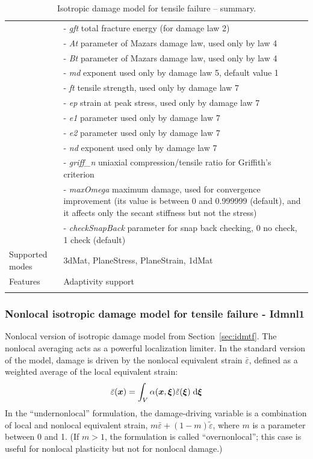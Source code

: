 \documentclass[a4paper]{article}
\newcommand{\mbf}[1]{\mbox{\boldmath$#1$}}
\newcommand{\param}[1]{{\it #1}}
\begin{document}
\begin{longtable}{|l|p{9cm}|}
&- \param{gft} total fracture energy (for damage law 2)\\
&- \param{At} parameter of Mazars damage law, used only by law 4\\
&- \param{Bt} parameter of Mazars damage law, used only by law 4\\
&- \param{md} exponent used only by damage law 5, default value 1\\
&- \param{ft} tensile strength, used only by damage law 7\\
&- \param{ep} strain at peak stress, used only by damage law 7\\
&- \param{e1} parameter used only by damage law 7\\
&- \param{e2} parameter used only by damage law 7\\
&- \param{nd} exponent used only by damage law 7\\
&- \param{griff\_n} uniaxial compression/tensile ratio for Griffith's criterion\\
&- \param{maxOmega} maximum damage, used for convergence improvement
(its value is between 0 and 0.999999 (default), and it affects only the secant stiffness
but not the stress)\\
&- \param{checkSnapBack} parameter for snap back checking, 0 no check, 1 check (default)\\
Supported modes& 3dMat, PlaneStress, PlaneStrain, 1dMat\\
Features & Adaptivity support\\
\hline
\caption{Isotropic damage model for tensile failure -- summary.}
\label{id_table}
\end{longtable}

\subsubsection{Nonlocal isotropic damage model for tensile failure - Idmnl1}
\label{sec:nidm}
Nonlocal version of isotropic damage model from Section~\ref{sec:idmtf}.
The nonlocal averaging acts as a powerful localization
limiter. 
In the standard version of the model, 
damage is driven by the nonlocal equivalent strain $\bar{\varepsilon}$, 
defined as a weighted average of the local equivalent strain:
$$
\bar{\varepsilon}(\mbf{x}) = \int_V\alpha(\mbf{x},\mbf{\xi})\tilde\varepsilon(\mbf{\xi})\;{\rm d}\mbf{\xi}
$$
In the ``undernonlocal'' formulation, the damage-driving variable is a 
combination of local and nonlocal equivalent strain, 
$m\bar{\varepsilon}+(1-m)\tilde\varepsilon$, where $m$ is a parameter between
0 and 1. (If $m>1$, the formulation is called ``overnonlocal''; this case
is useful for nonlocal plasticity but not for nonlocal damage.) 
\end{document}
